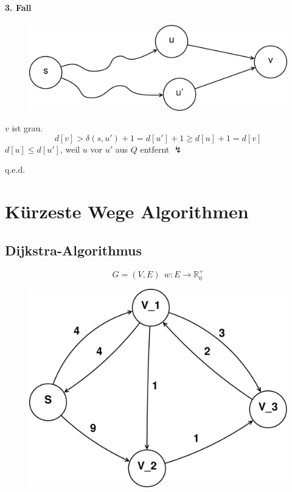 \paragraph{3. Fall}
\begin{figure}
	\includegraphics[width=\linewidth]{16/Grafik/Beweis}
	\caption{}
	\label{fig:Beweis}
\end{figure}
$v$ ist grau.
\[ d[v]>\delta(s,u')+1=d[u']+1\geq d[u]+1=d[v] \]
$d[u]\leq d[u']$, weil $u$ vor $u'$ aus $Q$ entfernt $\lightning$
\begin{flushright}
	q.e.d.
\end{flushright}
\section{Kürzeste Wege Algorithmen}
\subsection{Dijkstra-Algorithmus}
\[ G=(V,E)~~w:E\rightarrow \mathbb{R}^+_0 \]
\begin{figure}[h]
\centering
\includegraphics[width=0.3\linewidth]{16/Grafik/Dijkstra}
\caption{}
\label{fig:Dijkstra}
\end{figure}

